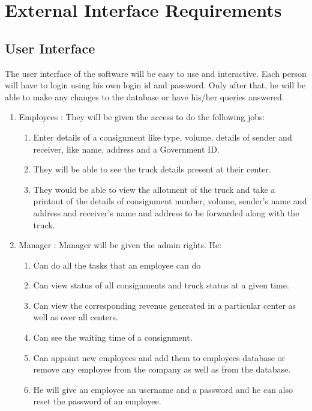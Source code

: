 \documentclass[english,openany,12pt,a4paper,dvipsnames]{book}
\begin{document}
\markboth{}{}
\section{External Interface Requirements}
        \subsection{User Interface}
        The user interface of the software will be easy to use and interactive. Each person will have to login
        using his own login id and password. Only after that, he will be able to make any changes to the
        database or have his/her queries answered.
        \begin{enumerate}
          \item Employees : They will be given the access to do the following jobs:
                \begin{enumerate}
             \item Enter details of a consignment like type, volume, details of sender and receiver, like
                name, address and a Government ID.
             \item They will be able to see the truck details present at their center.
             \item They would be able to view the allotment of the truck and take a printout of the details of
                consignment number, volume, sender’s name and address and receiver’s name and
                address to be forwarded along with the truck.
             \end{enumerate}
          \item Manager : Manager will be given the admin rights. He:
                  \begin{enumerate}
             \item Can do all the tasks that an employee can do
             \item Can view status of all consignments and truck status at a given time.
             \item Can view the corresponding revenue generated in a particular center as well as over all centers.
             \item Can see the waiting time of a consignment.
             \item Can appoint new employees and add them to employees database or remove any employee from the company as well    as from the database.
             \item He will give an employee an username and a password and he can also reset the
        password of an employee.
             \end{enumerate}
        \end{enumerate}
\end{document}
